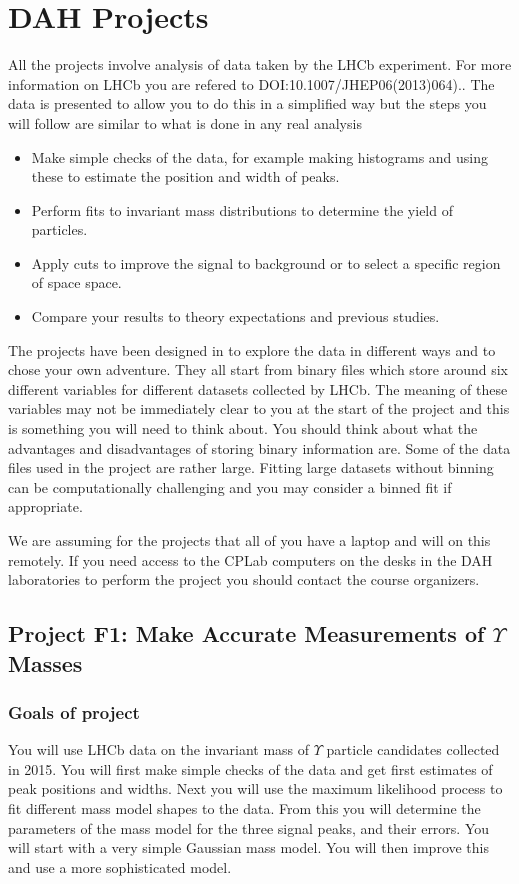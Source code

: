 \chapter{DAH Projects}
\label{sec:projects}
%
All the projects involve analysis of data taken by the LHCb experiment. For more information on LHCb you are refered to  {DOI:10.1007/JHEP06(2013)064).}. The data is presented to allow you to do this in a simplified way but the steps you will follow are similar to what is done in any real analysis
\begin{itemize}
\item Make simple checks of the data, for example making histograms and using these to estimate the position and width of peaks.
\item Perform fits to invariant mass distributions to determine the yield of particles.
\item Apply cuts to improve the signal to background or to select a specific region of space space.
\item Compare your results to theory expectations and previous studies.
\end{itemize}
The projects have been designed in to explore the data in different ways and to chose your own adventure. They all start from binary files which store around six different variables for different datasets collected by LHCb. The meaning of these variables may not be immediately clear to you at the start of the project and this is something you will need to think about. You should think  about what the advantages and disadvantages of storing binary information are. Some of the data files used in the project are rather large. Fitting large datasets without binning can be computationally challenging and you may consider a binned fit if appropriate.

We are assuming for the projects that all of you have a laptop and will on this remotely. If you need access to the CPLab computers on the desks in the DAH laboratories to perform the project you should contact the course organizers.

\section{Project F1: Make Accurate Measurements of $\Upsilon$  Masses}

\subsection{Goals of project}
%
You will use LHCb data on the invariant mass of $\Upsilon$ particle candidates collected in 2015. You will first make simple checks of the data and get first estimates of peak positions and widths.  Next you will use the maximum likelihood process to fit different mass model shapes to the data. From this you will determine the parameters of the mass model for the three signal peaks, and their errors. You will start with a very simple Gaussian mass model. You will then improve this and use a more sophisticated model.

